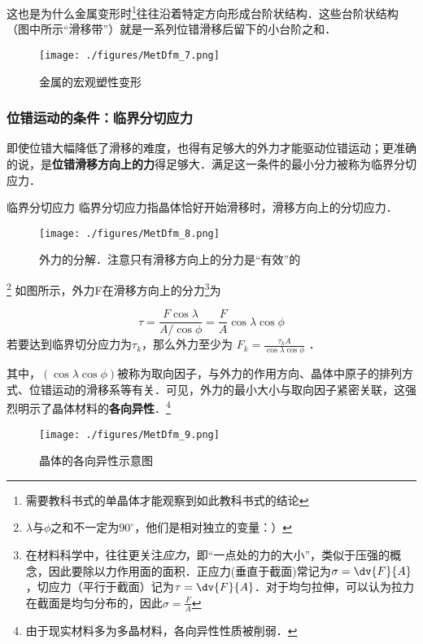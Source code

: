 这也是为什么金属变形时\footnote{需要教科书式的单晶体才能观察到如此教科书式的结论}往往沿着特定方向形成台阶状结构．这些台阶状结构（图中所示“滑移带”）就是一系列位错滑移后留下的小台阶之和．
\begin{figure}[ht]
\centering
\texttt{[image: ./figures/MetDfm\_7.png]}
\caption{金属的宏观塑性变形} \label{MetDfm_fig7}
\end{figure}

\subsubsection{位错运动的条件：临界分切应力}
即使位错大幅降低了滑移的难度，也得有足够大的外力才能驱动位错运动；更准确的说，是\textbf{位错滑移方向上的力}得足够大．满足这一条件的最小分力被称为临界分切应力．

\begin{definition}{临界分切应力}
临界分切应力指晶体恰好开始滑移时，滑移方向上的分切应力．
\end{definition}

\begin{figure}[ht]
\centering
\texttt{[image: ./figures/MetDfm\_8.png]}
\caption{外力的分解．注意只有滑移方向上的分力是“有效”的} \label{MetDfm_fig8}
\end{figure}
\footnote{$\lambda$与$\phi$之和不一定为$90^\circ$，他们是相对独立的变量：）}
如图所示，外力F在滑移方向上的分力\footnote{在材料科学中，往往更关注\textsl{应力}，即“一点处的力的大小”，类似于压强的概念，因此要除以力作用面的面积．正应力(垂直于截面)常记为$\sigma=\dv{F}{A}$，切应力（平行于截面）记为$\tau=\dv{F}{A}$．对于均匀拉伸，可以认为拉力在截面是均匀分布的，因此$\sigma=\frac{F}{A}$}为

$$\tau=\frac{F \cos \lambda}{A/{\cos \phi}}=\frac{F}{A}{\cos \lambda}{\cos \phi}$$
若要达到临界切分应力为$\tau_k$，那么外力至少为 $F_k=\frac{\tau_k A}{\cos \lambda \cos \phi} $ ．

其中，$(\cos \lambda \cos \phi)$被称为取向因子，与外力的作用方向、晶体中原子的排列方式、位错运动的滑移系等有关．可见，外力的最小大小与取向因子紧密关联，这强烈明示了晶体材料的\textbf{各向异性}．\footnote{由于现实材料多为多晶材料，各向异性性质被削弱．}

\begin{figure}[ht]
\centering
\texttt{[image: ./figures/MetDfm\_9.png]}
\caption{晶体的各向异性示意图} \label{MetDfm_fig9}
\end{figure}
